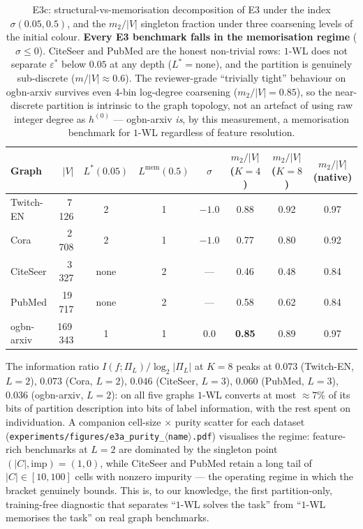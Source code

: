 \documentclass[10pt]{article}
\theoremstyle{definition}
\theoremstyle{remark}
\newcommand{\eps}{\varepsilon}
\begin{document}
\begin{table}[h]\centering\small
\begin{tabular}{lrcccccc}
\toprule
Graph & $|V|$ & $L^{*}(0.05)$ & $L^{\mathrm{mem}}(0.5)$
      & $\sigma$ & $m_{2}/|V|$ ($K{=}4$)
      & $m_{2}/|V|$ ($K{=}8$) & $m_{2}/|V|$ (native) \\
\midrule
Twitch-EN  & 7\,126   & 2    & 1 & $-1.0$ & 0.88 & 0.92 & 0.97 \\
Cora       & 2\,708   & 2    & 1 & $-1.0$ & 0.77 & 0.80 & 0.92 \\
CiteSeer   & 3\,327   & none & 2 & ---    & 0.46 & 0.48 & 0.84 \\
PubMed     & 19\,717  & none & 2 & ---    & 0.58 & 0.62 & 0.84 \\
ogbn-arxiv & 169\,343 & 1    & 1 & $0.0$  & \textbf{0.85} & 0.89 & 0.97 \\
\bottomrule
\end{tabular}
\caption{E3c: structural-vs-memorisation decomposition of E3 under
the index $\sigma(0.05, 0.5)$, and the $m_{2}/|V|$ singleton
fraction under three coarsening levels of the initial colour.
\textbf{Every E3 benchmark falls in the memorisation regime}
($\sigma \le 0$). CiteSeer and PubMed are the honest non-trivial
rows: $1$-WL does not separate $\eps^{*}$ below $0.05$ at any
depth ($L^{*} = \mathrm{none}$), and the partition is genuinely
sub-discrete ($m/|V| \approx 0.6$). The reviewer-grade
``trivially tight'' behaviour on ogbn-arxiv survives even
4-bin log-degree coarsening ($m_{2}/|V| = 0.85$), so the
near-discrete partition is intrinsic to the graph topology, not
an artefact of using raw integer degree as $h^{(0)}$ ---
ogbn-arxiv \emph{is}, by this measurement, a memorisation
benchmark for $1$-WL regardless of feature resolution.}
\label{tab:e3c}
\end{table}

The information ratio
$I(f; \Pi_{L}) / \log_{2}|\Pi_{L}|$ at $K{=}8$ peaks at $0.073$
(Twitch-EN, $L{=}2$), $0.073$ (Cora, $L{=}2$), $0.046$
(CiteSeer, $L{=}3$), $0.060$ (PubMed, $L{=}3$), $0.036$
(ogbn-arxiv, $L{=}2$): on all five graphs $1$-WL converts at
most $\approx 7\%$ of its bits of partition description into
bits of label information, with the rest spent on individuation.
A companion cell-size $\times$ purity scatter for each dataset
(\texttt{experiments/figures/e3a\_purity\_$\langle$name$\rangle$.pdf})
visualises the regime: feature-rich benchmarks at $L = 2$ are
dominated by the singleton point $(|C|, \mathrm{imp}) = (1, 0)$,
while CiteSeer and PubMed retain a long tail of $|C| \in
[10, 100]$ cells with nonzero impurity --- the operating regime
in which the bracket genuinely bounds. This is, to our
knowledge, the first partition-only, training-free diagnostic
that separates ``$1$-WL solves the task'' from ``$1$-WL
memorises the task'' on real graph benchmarks.
\end{document}
